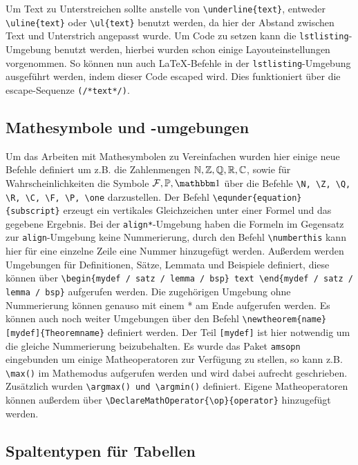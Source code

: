 \documentclass{myReport}
\begin{document}
Um Text zu Unterstreichen sollte anstelle von \lstinline|\underline{text}|, entweder \lstinline|\uline{text}| oder \lstinline|\ul{text}| benutzt werden, da hier der Abstand zwischen Text und Unterstrich angepasst wurde. Um Code zu setzen kann die \texttt{lstlisting}-Umgebung benutzt werden, hierbei wurden schon einige Layouteinstellungen vorgenommen. So können nun auch \LaTeX-Befehle in der \texttt{lstlisting}-Umgebung ausgeführt werden, indem dieser Code escaped wird. Dies funktioniert über die escape-Sequenze \lstinline|(/*text*/)|.

\subsection{Mathesymbole und -umgebungen}

Um das Arbeiten mit Mathesymbolen zu Vereinfachen wurden hier einige neue Befehle definiert um z.B. die Zahlenmengen $\mathbb{N}, \mathbb{Z}, \mathbb{Q}, \mathbb{R}, \mathbb{C}$, sowie für Wahrscheinlichkeiten die Symbole $\F, \P, \one$ über die Befehle \lstinline|\N, \Z, \Q, \R, \C, \F, \P, \one| darzustellen. Der Befehl \lstinline|\equnder{equation}{subscript}| erzeugt ein vertikales Gleichzeichen unter einer Formel und das gegebene Ergebnis. Bei der \texttt{align*}-Umgebung haben die Formeln im Gegensatz zur \texttt{align}-Umgebung keine Nummerierung, durch den Befehl \lstinline|\numberthis| kann hier für eine einzelne Zeile eine Nummer hinzugefügt werden. Außerdem werden Umgebungen für Definitionen, Sätze, Lemmata und Beispiele definiert, diese können über \lstinline|\begin{mydef / satz / lemma / bsp} text \end{mydef / satz / lemma / bsp}| aufgerufen werden. Die zugehörigen Umgebung ohne Nummerierung können genauso mit einem * am Ende aufgerufen werden. Es können auch noch weiter Umgebungen über den Befehl \lstinline|\newtheorem{name}[mydef]{Theoremname}| definiert werden. Der Teil \lstinline|[mydef]| ist hier notwendig um die gleiche Nummerierung beizubehalten. Es wurde das Paket \texttt{amsopn} eingebunden um einige Matheoperatoren zur Verfügung zu stellen, so kann z.B. \lstinline|\max()| im Mathemodus aufgerufen werden und wird dabei aufrecht geschrieben. Zusätzlich wurden \lstinline|\argmax() und \argmin()| definiert. Eigene Matheoperatoren können außerdem über \lstinline|\DeclareMathOperator{\op}{operator}| hinzugefügt werden.

\subsection{Spaltentypen für Tabellen}
\end{document}
